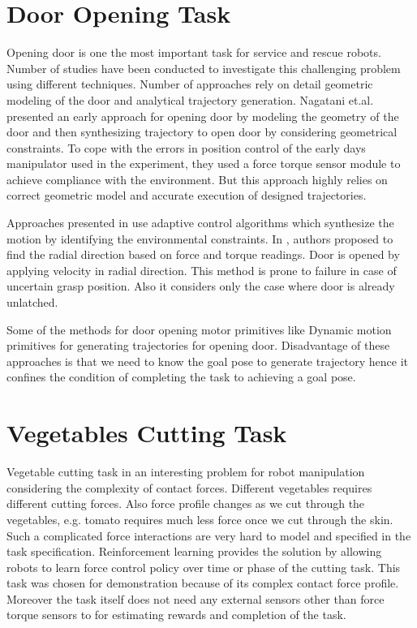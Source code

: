 \documentclass[thesis]{mas_proposal}
\begin{document}
\section{Door Opening Task}

Opening door is one the most important task for service and rescue robots. Number of studies have been conducted to investigate this challenging problem using different techniques. Number of approaches rely on detail geometric modeling of the door and analytical trajectory generation. Nagatani et.al. \cite{nagatani1995experiment} presented an early approach for opening door by modeling the geometry of the door and then synthesizing trajectory to open door by considering geometrical constraints. To cope with the errors in position control of the early days manipulator used in the experiment, they used a force torque sensor module to achieve compliance with the environment. But this approach highly relies on correct geometric model and accurate execution of designed trajectories.

Approaches presented in \cite{levihn2014using,karayiannidis2012adaptive,niemeyer1997simple} use adaptive control algorithms which synthesize the motion by identifying the environmental constraints. In \cite{karayiannidis2012adaptive}, authors proposed to find the radial direction based on force and torque readings. Door is opened by applying velocity in radial direction. This method is prone to failure in case of uncertain grasp position. Also it considers only the case where door is already unlatched. 

Some of the methods for door opening motor primitives like Dynamic motion primitives for generating trajectories for opening door. Disadvantage of these approaches is that we need to know the goal pose to generate trajectory hence it confines the condition of completing the task to achieving a goal pose. 

\section{Vegetables Cutting Task}
Vegetable cutting task in an interesting problem for robot manipulation considering the complexity of contact forces. Different vegetables requires different cutting forces. Also force profile changes as we cut through the vegetables, e.g. tomato requires much less force once we cut through the skin. Such a complicated force interactions are very hard to model and specified in the task specification. Reinforcement learning provides the solution by allowing robots to learn force control policy over time or phase of the cutting task. This task was chosen for demonstration because of its complex contact force profile. Moreover the task itself does not need any external sensors other than force torque sensors to for estimating rewards and completion of the task.
\end{document}
